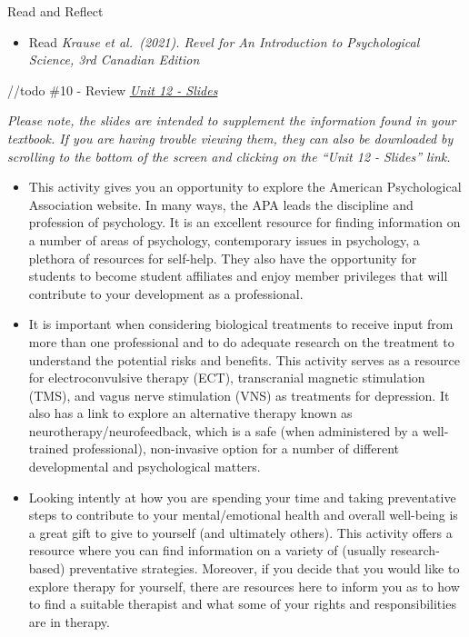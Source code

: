 \documentclass[
]{book}
\providecommand{\tightlist}{%
  \setlength{\itemsep}{0pt}\setlength{\parskip}{0pt}}
\begin{document}
\begin{reflect}
{Read and Reflect}

\begin{itemize}
\tightlist
\item
  Read \emph{Krause et al.~(2021). Revel for An Introduction to Psychological Science, 3rd Canadian Edition}
\end{itemize}

//todo \#10
- Review \href{PSYC106-CH16Therapies3rdEd.pptx}{\emph{Unit 12 - Slides}}

\emph{Please note, the slides are intended to supplement the information found in your textbook. If you are having trouble viewing them, they can also be downloaded by scrolling to the bottom of the screen and clicking on the ``Unit 12 - Slides'' link.}

\begin{itemize}
\item
  This activity gives you an opportunity to explore the American Psychological Association website. In many ways, the APA leads the discipline and profession of psychology. It is an excellent resource for finding information on a number of areas of psychology, contemporary issues in psychology, a plethora of resources for self-help. They also have the opportunity for students to become student affiliates and enjoy member privileges that will contribute to your development as a professional.
\item
  It is important when considering biological treatments to receive input from more than one professional and to do adequate research on the treatment to understand the potential risks and benefits. This activity serves as a resource for electroconvulsive therapy (ECT), transcranial magnetic stimulation (TMS), and vagus nerve stimulation (VNS) as treatments for depression. It also has a link to explore an alternative therapy known as neurotherapy/neurofeedback, which is a safe (when administered by a well-trained professional), non-invasive option for a number of different developmental and psychological matters.
\item
  Looking intently at how you are spending your time and taking preventative steps to contribute to your mental/emotional health and overall well-being is a great gift to give to yourself (and ultimately others). This activity offers a resource where you can find information on a variety of (usually research-based) preventative strategies. Moreover, if you decide that you would like to explore therapy for yourself, there are resources here to inform you as to how to find a suitable therapist and what some of your rights and responsibilities are in therapy.
\end{itemize}


\end{reflect}
\end{document}
